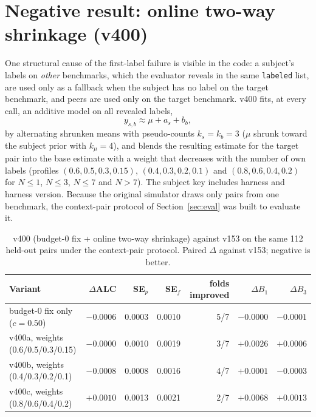 \documentclass{article}
\begin{document}
\section{Negative result: online two-way shrinkage (v400)}
\label{app:v400}
One structural cause of the first-label failure is visible in the code: a subject's labels on \emph{other} benchmarks, which the evaluator reveals in the same \texttt{labeled} list, are used only as a fallback when the subject has no label on the target benchmark, and peers are used only on the target benchmark. v400 fits, at every call, an additive model on all revealed labels,
\[
y_{s,b} \approx \mu + a_s + b_b,
\]
by alternating shrunken means with pseudo-counts $k_s=k_b=3$ ($\mu$ shrunk toward the subject prior with $k_\mu=4$), and blends the resulting estimate for the target pair into the base estimate with a weight that decreases with the number of own labels (profiles $(0.6,0.5,0.3,0.15)$, $(0.4,0.3,0.2,0.1)$ and $(0.8,0.6,0.4,0.2)$ for $N\le1$, $N\le3$, $N\le7$ and $N>7$). The subject key includes harness and harness version. Because the original simulator draws only pairs from one benchmark, the context-pair protocol of Section~\ref{sec:eval} was built to evaluate it.

\begin{table}[h]
\caption{v400 (budget-0 fix + online two-way shrinkage) against v153 on the same 112 held-out pairs under the context-pair protocol. Paired $\Delta$ against v153; negative is better.}
\label{tab:v400}
\centering\small
\begin{tabular}{lrrrrrr}
\toprule
Variant & $\Delta$ALC & SE$_p$ & SE$_f$ & folds improved & $\Delta B_1$ & $\Delta B_3$ \\
\midrule
budget-0 fix only ($c{=}0.50$) & $-0.0006$ & 0.0003 & 0.0010 & 5/7 & $-0.0000$ & $-0.0001$ \\
v400a, weights (0.6/0.5/0.3/0.15) & $-0.0000$ & 0.0010 & 0.0019 & 3/7 & $+0.0026$ & $+0.0006$ \\
v400b, weights (0.4/0.3/0.2/0.1) & $-0.0008$ & 0.0008 & 0.0016 & 4/7 & $+0.0001$ & $-0.0003$ \\
v400c, weights (0.8/0.6/0.4/0.2) & $+0.0010$ & 0.0013 & 0.0021 & 2/7 & $+0.0068$ & $+0.0013$ \\
\bottomrule
\end{tabular}
\end{table}
\end{document}
